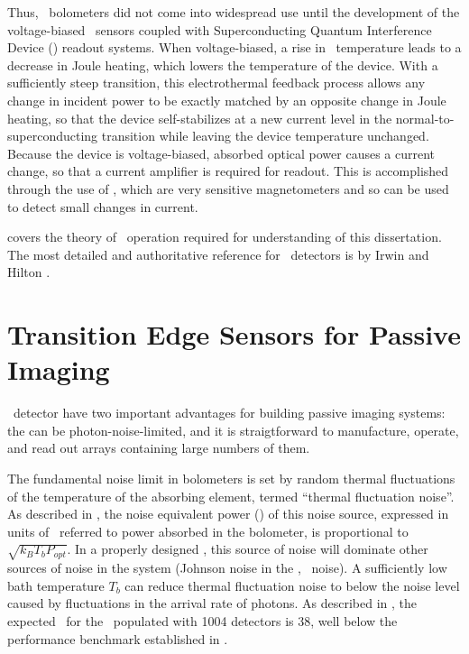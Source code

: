 Thus, \TES\ bolometers did not come into widespread use until the development of the voltage-biased \TES\ sensors \cite{irwin_application_1995} coupled with Superconducting Quantum Interference Device (\SQUID) readout systems.
When voltage-biased, a rise in \TES\ temperature leads to a decrease in Joule heating, which lowers the temperature of the device.
With a sufficiently steep transition, this electrothermal feedback process allows any change in incident power to be exactly matched by an opposite change in Joule heating, so that the device self-stabilizes at a new current level in the normal-to-superconducting transition while leaving the device temperature unchanged.
Because the device is voltage-biased, absorbed optical power causes a current change, so that a current amplifier is required for readout.
This is accomplished through the use of \SQUIDs, which are very sensitive magnetometers and so can be used to detect small changes in current.

 covers the theory of \TES\ operation required for understanding of this dissertation.
The most detailed and authoritative reference for \TES\ detectors is by Irwin and Hilton \cite{irwin_transition-edge_2005}.

\section{Transition Edge Sensors for Passive Imaging} \label{sec:ch2-tes-passive}

\TES\ detector have two important advantages for building passive imaging systems: the can be photon-noise-limited, and it is straigtforward to manufacture, operate, and read out arrays containing large numbers of them.

The fundamental noise limit in bolometers is set by random thermal fluctuations of the temperature of the absorbing element, termed ``thermal fluctuation noise''.
As described in , the noise equivalent power (\NEP) of this noise source, expressed in units of \pnoise\ referred to power absorbed in the bolometer, is proportional to $\sqrt{k_B T_b P_{opt}}$.
In a properly designed \TES, this source of noise will dominate other sources of noise in the system (Johnson noise in the \TES, \SQUID\ noise).
A sufficiently low bath temperature $T_b$ can reduce thermal fluctuation noise to below the noise level caused by fluctuations in the arrival rate of photons.
As described in , the expected \NETD\ for the \Imager\ populated with 1004 detectors is \SI{38}{\mK}, well below the performance benchmark established in .

